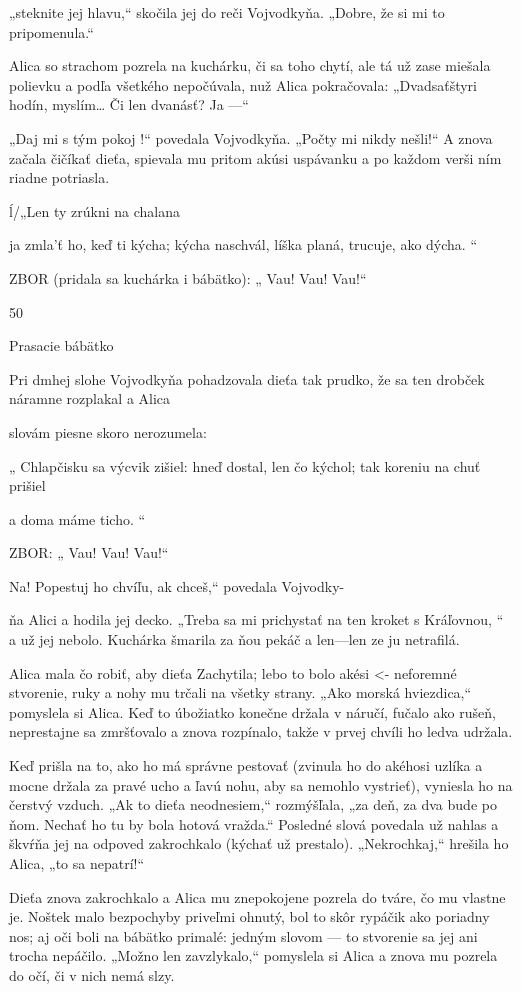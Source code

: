 \documentclass[12pt]{book}
\begin{document}
\begin{Parallel}[p]{}{}
{„steknite jej  hlavu,“ skočila jej do reči Vojvodkyňa.
„Dobre, že si mi to pripomenula.“

Alica so strachom pozrela na kuchárku, či sa toho chytí,
ale tá už zase miešala polievku a podľa všetkého nepočúvala,
nuž Alica pokračovala: „Dvadsaťštyri hodín, myslím… Či
len dvanásť? Ja —“

„Daj mi s tým pokoj !“ povedala Vojvodkyňa. „Počty mi
nikdy nešli!“ A znova začala čičíkať dieťa, spievala mu
pritom akúsi uspávanku a po každom verši ním riadne
potriasla.

 ĺ/„Len ty zrúkni na chalana

ja zmla'ť ho, keď ti kýcha;
kýcha naschvál, líška planá,
trucuje, ako dýcha. “

ZBOR
(pridala sa kuchárka i bábätko):
„ Vau! Vau! Vau!“

50

Prasacie bábätko

Pri dmhej slohe Vojvodkyňa pohadzovala dieťa tak
prudko, že sa ten drobček náramne rozplakal a Alica

slovám piesne skoro nerozumela:

„ Chlapčisku sa výcvik zišiel:
hneď dostal, len čo kýchol;
tak koreniu na chuť prišiel

a doma máme ticho. “

ZBOR:
„ Vau! Vau! Vau!“

Na! Popestuj ho chvíľu, ak chceš,“ povedala Vojvodky-

ňa Alici a hodila jej decko. „Treba sa mi prichystať na ten
kroket s Kráľovnou, “ a už jej nebolo. Kuchárka šmarila za
ňou pekáč a len—len ze ju netrafilá.

Alica mala čo robiť, aby dieťa Zachytila; lebo to bolo akési <-
neforemné stvorenie, ruky a nohy mu trčali na všetky strany.
„Ako morská hviezdica,“ pomyslela si Alica. Keď to
úbožiatko konečne držala v náručí, fučalo ako rušeň,
neprestajne sa zmršťovalo a znova rozpínalo, takže v prvej
chvíli ho ledva udržala.

Keď prišla na to, ako ho má správne pestovať (zvinula ho
do akéhosi uzlíka a mocne držala za pravé ucho a ľavú nohu,
aby sa nemohlo vystrieť), vyniesla ho na čerstvý vzduch. „Ak
to dieťa neodnesiem,“ rozmýšľala, „za deň, za dva bude po
ňom. Nechať ho tu by bola hotová vražda.“ Posledné slová
povedala už nahlas a škvŕňa jej na odpoved zakrochkalo
(kýchať už prestalo). „Nekrochkaj,“ hrešila ho Alica, „to sa
nepatrí!“

Dieťa znova zakrochkalo a Alica mu znepokojene pozrela
do tváre, čo mu vlastne je. Noštek malo bezpochyby
priveľmi ohnutý, bol to skôr rypáčik ako poriadny nos; aj oči
boli na bábätko primalé: jedným slovom — to stvorenie sa
jej ani trocha nepáčilo. „Možno len zavzlykalo,“ pomyslela
si Alica a znova mu pozrela do očí, či v nich nemá slzy.

}
\end{Parallel}
\end{document}
